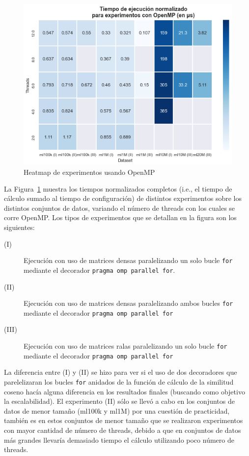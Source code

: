 \documentclass[11pt, a4paper]{article}
\begin{document}
  \begin{figure}[ht]
    \centering
    \includegraphics[width=\textwidth]{plots/heatmap_openmp.png}
      \caption{Heatmap de experimentos usando OpenMP}\label{fig:heatmap:omp}
  \end{figure}
 
  La Figura~\ref{fig:heatmap:omp} muestra los tiempos normalizados completos
  (i.e., el tiempo de cálculo sumado al tiempo de configuración) de distintos
  experimentos sobre los distintos conjuntos de datos, variando el número de
  threads con los cuales se corre OpenMP. Los tipos de experimentos que se
  detallan en la figura son los siguientes:

  \begin{description}
      \item[(I)] Ejecución con uso de matrices densas paralelizando un solo
          bucle \texttt{for} mediante el decorador \texttt{pragma omp parallel
          for}.
      \item[(II)] Ejecución con uso de matrices densas paralelizando ambos
          bucles \texttt{for} mediante el decorador \texttt{pragma omp parallel
          for}
      \item[(III)] Ejecución con uso de matrices ralas paralelizando un solo
          bucle \texttt{for} mediante el decorador \texttt{pragma omp parallel
          for}
  \end{description}
 
  La diferencia entre (I) y (II) se hizo para ver si el uso de dos decoradores
  que parelelizaran los bucles \texttt{for} anidados de la función de cálculo
  de la similitud coseno hacía alguna diferencia en los resultados finales
  (buscando como objetivo la escalabilidad). El experimento (II) sólo se llevó
  a cabo en los conjuntos de datos de menor tamaño (ml100k y ml1M) por una
  cuestión de practicidad, también es en estos conjuntos de menor tamaño que se
  realizaron experimentos con mayor cantidad de número de threads, debido a que
  en conjuntos de datos más grandes llevaría demasiado tiempo el cálculo
  utilizando poco número de threads.
\end{document}
